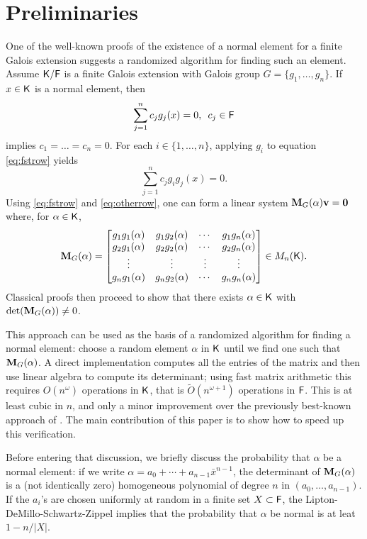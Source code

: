 \section{Preliminaries}
\label{sec:pre}

One of the well-known proofs of the existence of a normal element for a
finite Galois extension \cite[Theorem 6.13.1]{Lang} suggests a randomized
algorithm for finding such an element. Assume ${\mathsf{K}}/{\mathsf{F}}$ is a finite Galois
extension with Galois group $G = \lbrace g_1 , \ldots , g_n \rbrace$. If
$x \in {\mathsf{K}}$ is a normal element, then
\begin{equation}
  \label{eq:fstrow}
  \sum_{j=1}^n 
  c_j g_j(x)=0, \,\,\, c_j \in {\mathsf{F}} 
\end{equation} 
implies $c_1 =\ldots=c_n = 0$. For each
$i \in \lbrace 1, \ldots , n\rbrace$, applying $g_i$ to equation
\eqref{eq:fstrow} yields
\begin{equation} \label{eq:otherrow} \sum_{j=1}^n c_j g_i g_j(x)=0.
\end{equation}
Using \eqref{eq:fstrow} and \eqref{eq:otherrow}, one can form a linear
system $\mat{M}_G(\alpha)\textbf{v} = \textbf{0}$ where, for $\alpha\in{\mathsf{K}}$,
\[
  \mat M_G(\alpha) =
  \begin{bmatrix}
    g_1 g_1(\alpha) & g_1 g_2(\alpha) & \cdots & g_1 g_n(\alpha) \\
    g_2 g_1(\alpha) & g_2 g_2(\alpha) & \cdots & g_2 g_n(\alpha) \\
    \vdots		& \vdots	& \vdots & \vdots \\
    g_n g_1(\alpha) & g_n g_2(\alpha) & \cdots & g_n g_n(\alpha) \\
  \end{bmatrix} \in M_n(\K).
\]
Classical proofs then proceed to show that there exists $\alpha \in {\mathsf{K}}$
with $\det(\mat M_G(\alpha))\neq 0$.
 
This approach can be used as the basis of a randomized algorithm for
finding a normal element: choose a random element $\alpha$ in ${\mathsf{K}}$ until we
find one such that $ \mat M_G(\alpha)$. A direct implementation computes
all the entries of the matrix and then use linear algebra to compute its
determinant; using fast matrix arithmetic this requires $O(n^\omega)$
operations in ${\mathsf{K}}$, that is $\tilde{O}(n^{\omega+1})$ operations in
${\mathsf{F}}$. This is at least cubic in $n$, and only a minor improvement over the
previously best-known approach of . The main contribution
of this paper is to show how to speed up this verification.
 
Before entering that discussion, we briefly discuss the probability that
$\alpha$ be a normal element: if we write
$\alpha = a_0 + \cdots + a_{n-1} \bar x^{n-1}$, the determinant of
$\mat M_G(\alpha)$ is a (not identically zero) homogeneous polynomial of
degree $n$ in $(a_0,\dots,a_{n-1})$. If the $a_i$'s are chosen uniformly at
random in a finite set $X \subset {\mathsf{F}}$, the Lipton-DeMillo-Schwartz-Zippel
implies that the probability that $\alpha$ be normal is at leat $1-n/|X|$.

